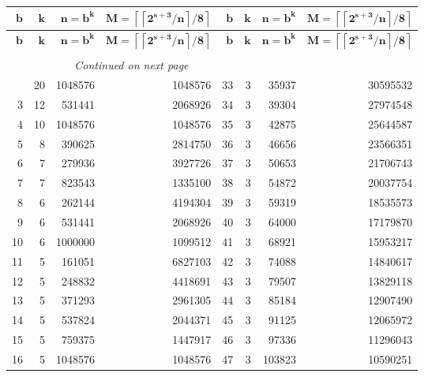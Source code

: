 \documentclass[a4paper,10pt]{article}
\providecommand{\ceil}[1]{\left\lceil#1\right\rceil}
\theoremstyle{plain} %
\theoremstyle{definition}
\theoremstyle{remark}
\begin{document}
\begin{center}
\begin{longtable}{r r r r | r r r r}
\multicolumn{1}{r}{$\mathbf{b}$}&
\multicolumn{1}{r}{$\mathbf{k}$}&
\multicolumn{1}{r}{$\mathbf{n = b^k}$}&
\multicolumn{1}{r}{$\mathbf{M = \ceil{\ceil{2^{s+3}/n}/8}}$}&
\multicolumn{1}{r}{$\mathbf{b}$}&
\multicolumn{1}{r}{$\mathbf{k}$}&
\multicolumn{1}{r}{$\mathbf{n = b^k}$}&
\multicolumn{1}{r}{$\mathbf{M = \ceil{\ceil{2^{s+3}/n}/8}}$}\\
\endfirsthead
%
\multicolumn{1}{r}{$\mathbf{b}$}&
\multicolumn{1}{r}{$\mathbf{k}$}&
\multicolumn{1}{r}{$\mathbf{n = b^k}$}&
\multicolumn{1}{r}{$\mathbf{M = \ceil{\ceil{2^{s+3}/n}/8}}$}&
\multicolumn{1}{r}{$\mathbf{b}$}&
\multicolumn{1}{r}{$\mathbf{k}$}&
\multicolumn{1}{r}{$\mathbf{n = b^k}$}&
\multicolumn{1}{r}{$\mathbf{M = \ceil{\ceil{2^{s+3}/n}/8}}$}\\
\endhead
\rule{0pt}{1ex}\\
\multicolumn{6}{c}{{\footnotesize{\textit{Continued on next page}}}} \\
\endfoot
\endlastfoot
2  & 20 & 1048576 & 1048576  &  33 & 3  & 35937   & 30595532 \\
3  & 12 & 531441  & 2068926  &  34 & 3  & 39304   & 27974548 \\
4  & 10 & 1048576 & 1048576  &  35 & 3  & 42875   & 25644587 \\
5  & 8  & 390625  & 2814750  &  36 & 3  & 46656   & 23566351 \\
6  & 7  & 279936  & 3927726  &  37 & 3  & 50653   & 21706743 \\
7  & 7  & 823543  & 1335100  &  38 & 3  & 54872   & 20037754 \\
8  & 6  & 262144  & 4194304  &  39 & 3  & 59319   & 18535573 \\
9  & 6  & 531441  & 2068926  &  40 & 3  & 64000   & 17179870 \\
10 & 6  & 1000000 & 1099512  &  41 & 3  & 68921   & 15953217 \\
11 & 5  & 161051  & 6827103  &  42 & 3  & 74088   & 14840617 \\
12 & 5  & 248832  & 4418691  &  43 & 3  & 79507   & 13829118 \\
13 & 5  & 371293  & 2961305  &  44 & 3  & 85184   & 12907490 \\
14 & 5  & 537824  & 2044371  &  45 & 3  & 91125   & 12065972 \\
15 & 5  & 759375  & 1447917  &  46 & 3  & 97336   & 11296043 \\
16 & 5  & 1048576 & 1048576  &  47 & 3  & 103823  & 10590251 \\

\end{longtable}
\end{center}
\end{document}
